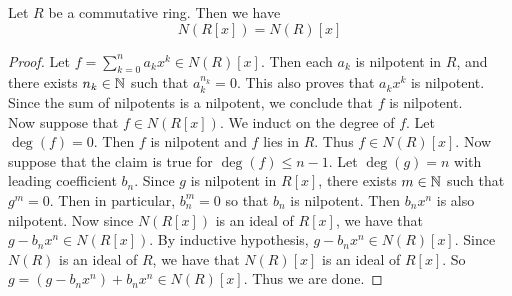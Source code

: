 \documentclass[a4paper]{article}
\begin{document}
\begin{prp}{}{} Let $R$ be a commutative ring. Then we have $$N(R[x])=N(R)[x]$$ 
\begin{proof}
Let $f=\sum_{k=0}^na_kx^k\in N(R)[x]$. Then each $a_k$ is nilpotent in $R$, and there exists $n_k\in\mathbb{N}$ such that $a_k^{n_k}=0$. This also proves that $a_kx^k$ is nilpotent. Since the sum of nilpotents is a nilpotent, we conclude that $f$ is nilpotent. \\

Now suppose that $f\in N(R[x])$. We induct on the degree of $f$. Let $\deg(f)=0$. Then $f$ is nilpotent and $f$ lies in $R$. Thus $f\in N(R)[x]$. Now suppose that the claim is true for $\deg(f)\leq n-1$. Let $\deg(g)=n$ with leading coefficient $b_n$. Since $g$ is nilpotent in $R[x]$, there exists $m\in\mathbb{N}$ such that $g^m=0$. Then in particular, $b_n^m=0$ so that $b_n$ is nilpotent. Then $b_nx^n$ is also nilpotent. Now since $N(R[x])$ is an ideal of $R[x]$, we have that $g-b_nx^n\in N(R[x])$. By inductive hypothesis, $g-b_nx^n\in N(R)[x]$. Since $N(R)$ is an ideal of $R$, we have that $N(R)[x]$ is an ideal of $R[x]$. So $g=(g-b_nx^n)+b_nx^n\in N(R)[x]$. Thus we are done. 
\end{proof}
\end{prp}
\end{document}
